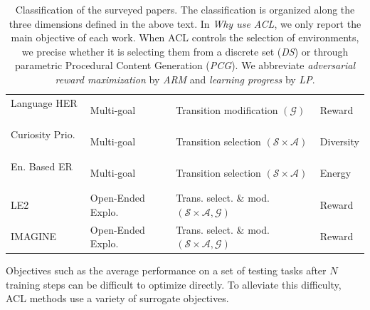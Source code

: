 \documentclass{article}
\begin{document}
\begin{table}[htb!]
\begin{tabular}{llll}
Language HER ~\cite{cideron2019self}              & Multi-goal        & Transition modification   $(\mathcal{G})$           & Reward              \\
 
Curiosity Prio. ~\cite{zhao2019curiosity} & Multi-goal  & Transition selection $(\mathcal{S}\times\mathcal{A})$            & Diversity         \\
 
En. Based ER ~\cite{eb-per}      &  Multi-goal            & Transition selection  $(\mathcal{S}\times\mathcal{A})$   & Energy                \\

 LE2 ~\cite{le2}                                  & Open-Ended Explo.            & Trans. select. \& mod. $(\mathcal{S}\times\mathcal{A}, \mathcal{G})$          & Reward      \\
  IMAGINE ~\cite{imagine}                         & Open-Ended Explo.            & Trans. select. \& mod. $(\mathcal{S}\times\mathcal{A}, \mathcal{G})$          & Reward      \\

 \bottomrule
\end{tabular}
\caption{Classification of the surveyed papers. The classification is organized along the three dimensions defined in the above text. In \textit{Why use ACL}, we only report the main objective of each work. When ACL controls the selection of environments, we precise whether it is selecting them from a discrete set (\textit{DS}) or through parametric Procedural Content Generation (\textit{PCG}). We abbreviate \textit{adversarial reward maximization} by \textit{ARM} and \textit{learning progress} by \textit{LP}.}
\label{bigtable}
\end{table}

Objectives such as the average performance on a set of testing tasks after $N$ training steps can be difficult to optimize directly. To alleviate this difficulty, ACL methods use a variety of surrogate objectives.
\end{document}
